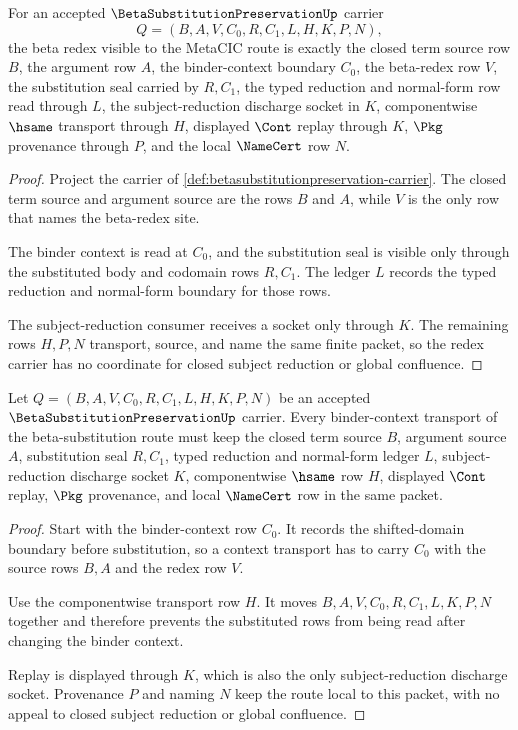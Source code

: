 \begin{theorem}
\label{thm:beta-substitution-preservation-redex-carrier}
For an accepted $\BetaSubstitutionPreservationUp$ carrier
$$
Q=(B,A,V,C_0,R,C_1,L,H,K,P,N),
$$
the beta redex visible to the MetaCIC route is exactly the closed term source row $B$, the argument row $A$, the binder-context boundary $C_0$, the beta-redex row $V$, the substitution seal carried by $R,C_1$, the typed reduction and normal-form row read through $L$, the subject-reduction discharge socket in $K$, componentwise $\hsame$ transport through $H$, displayed $\Cont$ replay through $K$, $\Pkg$ provenance through $P$, and the local $\NameCert$ row $N$.
\end{theorem}
\begin{proof}
Project the carrier of \autoref{def:betasubstitutionpreservation-carrier}. The closed term source and argument source are the rows $B$ and $A$, while $V$ is the only row that names the beta-redex site.

The binder context is read at $C_0$, and the substitution seal is visible only through the substituted body and codomain rows $R,C_1$. The ledger $L$ records the typed reduction and normal-form boundary for those rows.

The subject-reduction consumer receives a socket only through $K$. The remaining rows $H,P,N$ transport, source, and name the same finite packet, so the redex carrier has no coordinate for closed subject reduction or global confluence.
\end{proof}

\begin{theorem}
\label{thm:beta-substitution-preservation-context-transport}
Let $Q=(B,A,V,C_0,R,C_1,L,H,K,P,N)$ be an accepted $\BetaSubstitutionPreservationUp$ carrier. Every binder-context transport of the beta-substitution route must keep the closed term source $B$, argument source $A$, substitution seal $R,C_1$, typed reduction and normal-form ledger $L$, subject-reduction discharge socket $K$, componentwise $\hsame$ row $H$, displayed $\Cont$ replay, $\Pkg$ provenance, and local $\NameCert$ row in the same packet.
\end{theorem}
\begin{proof}
Start with the binder-context row $C_0$. It records the shifted-domain boundary before substitution, so a context transport has to carry $C_0$ with the source rows $B,A$ and the redex row $V$.

Use the componentwise transport row $H$. It moves $B,A,V,C_0,R,C_1,L,K,P,N$ together and therefore prevents the substituted rows from being read after changing the binder context.

Replay is displayed through $K$, which is also the only subject-reduction discharge socket. Provenance $P$ and naming $N$ keep the route local to this packet, with no appeal to closed subject reduction or global confluence.
\end{proof}

